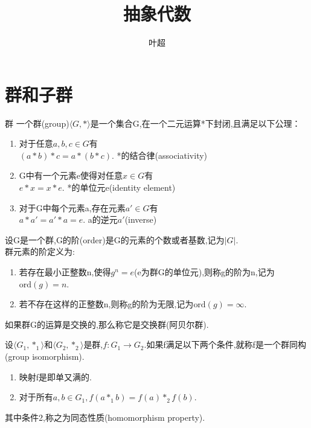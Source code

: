 \documentclass[oneside,openany]{ctexbook}
\title{抽象代数}
\author{叶超}
\begin{document}
\maketitle

\chapter{群和子群}

\begin{definition}{群}{}
一个群(group)$\langle G,* \rangle$是一个集合G,在一个二元运算*下封闭,且满足以下公理：
\begin{enumerate}
    \item 对于任意$a,b,c\in G$有\\
    $(a*b)*c=a*(b*c)$.  *的结合律(associativity)
    \item G中有一个元素e使得对任意$x\in G$有\\
    $e*x=x*e$.  *的单位元e(identity element)
    \item 对于G中每个元素a,存在元素$a'\in G$有\\
    $a*a'=a'*a=e$.  a的逆元$a'$(inverse)
\end{enumerate}
\end{definition}

\begin{definition}{}{}
设G是一个群,G的阶(order)是G的元素的个数或者基数,记为$|G|$.\\
群元素的阶定义为:
\begin{enumerate}
  \item 若存在最小正整数n,使得\(g^n = e\)(e为群G的单位元),则称g的阶为n,记为\(\text{ord}(g)=n\).
  \item 若不存在这样的正整数n,则称g的阶为无限,记为\(\text{ord}(g)=\infty\).
\end{enumerate}
\end{definition}

\begin{definition}{}{}
如果群G的运算是交换的,那么称它是交换群(阿贝尔群).
\end{definition}

\begin{definition}{}{}
设$\langle G_1,*_1 \rangle$和$\langle G_2,*_2 \rangle$是群,$f:G_1\rightarrow G_2$.如果f满足以下两个条件,就称f是一个群同构(group isomorphism).
\begin{enumerate}
    \item 映射f是即单又满的.
    \item 对于所有$a,b\in G_1,f(a*_1b)=f(a)*_2f(b)$.
\end{enumerate}
其中条件2,称之为同态性质(homomorphism property).
\end{definition}
\end{document}
